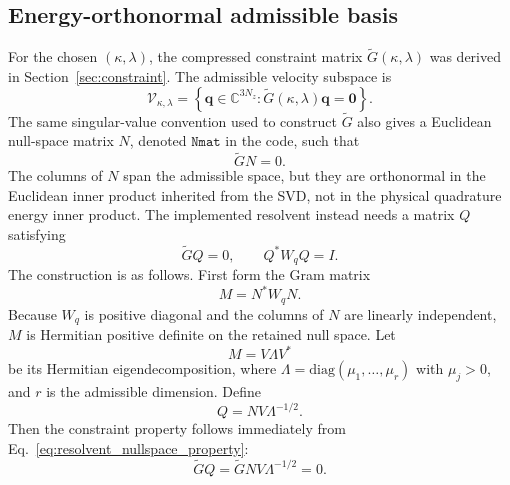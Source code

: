 \documentclass[11pt]{article}
\newcommand{\bfq}{\bm{q}}
\newcommand{\bfzero}{\bm{0}}
\newcommand{\Gtilde}{\widetilde{G}}
\begin{document}
\subsection{Energy-orthonormal admissible basis}

For the chosen \((\kappa,\lambda)\), the compressed constraint matrix
\(\Gtilde(\kappa,\lambda)\) was derived in
Section~\ref{sec:constraint}. The admissible velocity subspace is
\begin{equation}
  \mathcal{V}_{\kappa,\lambda}
  =
  \left\{
    \bfq\in\mathbb{C}^{3N_z}:
    \Gtilde(\kappa,\lambda)\bfq=\bfzero
  \right\}.
  \label{eq:resolvent_admissible_subspace}
\end{equation}
The same singular-value convention used to construct \(\Gtilde\) also gives a
Euclidean null-space matrix \(N\), denoted \(\texttt{Nmat}\) in the code, such
that
\begin{equation}
  \Gtilde N = 0.
  \label{eq:resolvent_nullspace_property}
\end{equation}
The columns of \(N\) span the admissible space, but they are orthonormal in
the Euclidean inner product inherited from the SVD, not in the physical
quadrature energy inner product. The implemented resolvent instead needs a
matrix \(Q\) satisfying
\begin{equation}
  \Gtilde Q=0,
  \qquad
  Q^*W_qQ=I.
  \label{eq:resolvent_q_requirements}
\end{equation}
The construction is as follows. First form the Gram matrix
\begin{equation}
  M = N^*W_qN.
  \label{eq:resolvent_gram_matrix}
\end{equation}
Because \(W_q\) is positive diagonal and the columns of \(N\) are linearly
independent, \(M\) is Hermitian positive definite on the retained null space.
Let
\begin{equation}
  M = V\Lambda V^*
  \label{eq:resolvent_gram_eigendecomposition}
\end{equation}
be its Hermitian eigendecomposition, where
\(\Lambda=\mathrm{diag}(\mu_1,\ldots,\mu_r)\) with \(\mu_j>0\), and \(r\) is
the admissible dimension. Define
\begin{equation}
  Q = N V \Lambda^{-1/2}.
  \label{eq:resolvent_q_definition}
\end{equation}
Then the constraint property follows immediately from
Eq.~\eqref{eq:resolvent_nullspace_property}:
\begin{equation}
  \Gtilde Q
  =
  \Gtilde N V\Lambda^{-1/2}
  =
  0.
  \label{eq:resolvent_q_constraint_proof}
\end{equation}
\end{document}
